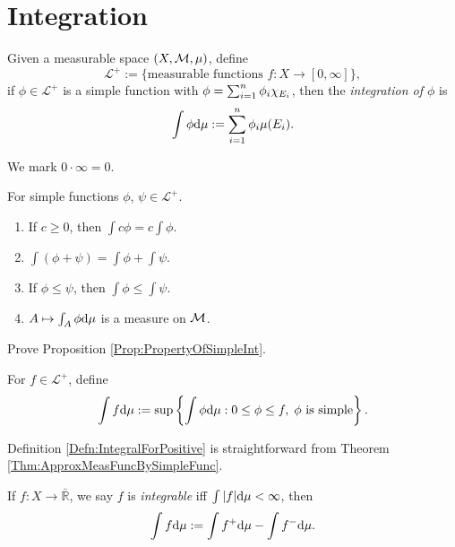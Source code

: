 \section{Integration}
\begin{defn}
    \label{Defn:IntegralOfSimpleFunc}
    Given a measurable space $(X,\mathcal{M},\mu)$, define 
    \begin{displaymath}
        \mathcal{L}^{+}:=\{\text{measurable functions }f:
        X\rightarrow[0,\infty]\},
    \end{displaymath}
    if $\phi\in \mathcal{L}^{+}$ is a simple function with 
    $\phi=\sum_{i=1}^{n}\phi_{i}\chi_{E_i}$, then 
    the \textit{integration of $\phi$} is 
    \begin{displaymath}
        \int\phi\mathrm{d}\mu:=\sum_{i=1}^{n}\phi_{i}\mu(E_i).
    \end{displaymath}
\end{defn}
\begin{rem}
    We mark $0\cdot\infty=0$.
\end{rem}
\begin{prop}
    \label{Prop:PropertyOfSimpleInt}
    For simple functions $\phi$, $\psi\in\mathcal{L}^{+}$. 
    \begin{enumerate}
        \item If $c\ge 0$, then $\int c\phi=c\int\phi$. 
        \item $\int(\phi+\psi)=\int\phi+\int\psi$.
        \item If $\phi\le\psi$, then $\int\phi\le\int\psi$. 
        \item $A\mapsto \int_{A}\phi\mathrm{d}\mu$ is a measure on $\mathcal{M}$.
    \end{enumerate}
\end{prop}
\begin{exc}
    Prove Proposition \ref{Prop:PropertyOfSimpleInt}.
\end{exc}
\begin{defn}
    \label{Defn:IntegralForPositive}
    For $f\in \mathcal{L}^{+}$, define 
    \begin{displaymath}
        \int f\mathrm{d}\mu:=\sup\left\{\int\phi\mathrm{d}\mu:0\le\phi\le f,
        \;\phi\text{ is simple}\right\}.
    \end{displaymath}
\end{defn}
\begin{rem}
    Definition \ref{Defn:IntegralForPositive} is straightforward 
    from Theorem \ref{Thm:ApproxMeasFuncBySimpleFunc}.
\end{rem}
\begin{defn}
    \label{Defn:RealValuedFuncInt}
    If $f:X\rightarrow\bar{\mathbb{R}}$, we say 
    $f$ is \textit{integrable} iff $\int|f|\mathrm{d}\mu<\infty$, 
    then 
    \begin{displaymath}
        \int f\mathrm{d}\mu:=\int f^{+}\mathrm{d}\mu-\int f^{-}\mathrm{d}\mu.
    \end{displaymath}
\end{defn}
